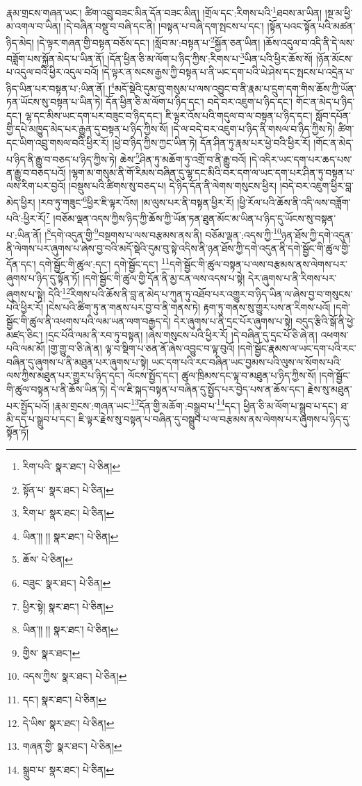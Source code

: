 རྣམ་གྲངས་གཞན་ཡང་། ཚིག་འབྲུ་བཟང་མིན་དོན་བཟང་མིན། །གྲོལ་དང་:རིགས་པའི་\footnote{རིག་པའི་  སྣར་ཐང་།  པེ་ཅིན། }ཐབས་མ་ཡིན། །སྔ་མ་ཕྱི་མ་འགལ་བ་ཡིན། །དེ་བཞིན་བསྡུ་བ་བཞི་དང་ནི། །བསྟན་པ་བཞི་དག་སྤངས་པ་དང་། །སྟོན་པའང་སྟོན་པའི་མཚན་ཉིད་མེད། །དེ་ལྟར་གཞན་གྱི་བསྟན་བཅོས་དང་། །སློབ་མ་:བསྟན་པ་\footnote{སྟོན་པ་  སྣར་ཐང་།  པེ་ཅིན། }སྐྱོན་ཅན་ཡིན། །ཆོས་འདུལ་བ་འདི་ནི་དེ་ལས་བཟློག་པས་སྐྱོན་མེད་པ་ཡིན་ནོ། །དོན་ཕྱིན་ཅི་མ་ལོག་པ་ཉིད་ཀྱིས་:རིགས་པ་\footnote{རིག་པ་  སྣར་ཐང་།  པེ་ཅིན། }ཡིན་པའི་ཕྱིར་ཆོས་སོ། །ཉོན་མོངས་པ་འདུལ་བའི་ཕྱིར་འདུལ་བའོ། །དེ་ལྟར་ན་སངས་རྒྱས་ཀྱི་བསྟན་པ་ནི་ཡང་དག་པའི་ཡེ་ཤེས་དང་སྤངས་པ་འདྲེན་པ་ཉིད་ཡིན་པར་བསྟན་པ་:ཡིན་ནོ། །\footnote{ཡིན་།། །།  སྣར་ཐང་།  པེ་ཅིན། }མདོ་སྡེའི་དུམ་བུ་གསུམ་པ་ལས་འབྱུང་བ་ནི་རྣམ་པ་དྲུག་དག་གིས་ཆོས་ཀྱི་ཡོན་ཏན་ཡོངས་སུ་བསྟན་པ་ཡིན་ཏེ། དོན་ཕྱིན་ཅི་མ་ལོག་པ་ཉིད་དང་། བདེ་བར་འཇུག་པ་ཉིད་དང་། གོང་ན་མེད་པ་ཉིད་དང་། ལྷ་དང་མིས་ཡང་དག་པར་བཟུང་བ་ཉིད་དང་། ཇི་ལྟར་འོས་པའི་གདུལ་བ་ལ་བསྟན་པ་ཉིད་དང་། སློབ་དཔོན་གྱི་དཔེ་མཁྱུད་མེད་པར་རྒྱུན་དུ་བསྟན་པ་ཉིད་ཀྱིས་སོ། །དེ་ལ་བདེ་བར་འཇུག་པ་ཉིད་ནི་གསལ་བ་ཉིད་ཀྱིས་ཏེ། ཚིག་དང་ཡིག་འབྲུ་གསལ་བའི་ཕྱིར་རོ། །ཕྱེ་བ་ཉིད་ཀྱིས་ཀྱང་ཡིན་ཏེ། དོན་ཤིན་ཏུ་རྣམ་པར་ཕྱེ་བའི་ཕྱིར་རོ། །གོང་ན་མེད་པ་ཉིད་ནི་རྒྱུ་བ་བཅད་པ་ཉིད་ཀྱིས་ཏེ། ཆེས་\footnote{ཆོས་  པེ་ཅིན། }ཤིན་ཏུ་མཆོག་ཏུ་འགྲོ་བ་ནི་རྒྱུ་བའོ། །དེ་འདིར་ཡང་དག་པར་ཆད་པས་ན་རྒྱུ་བ་བཅད་པའོ། །ལྷག་མ་གསུམ་ནི་གོ་རིམས་བཞིན་དུ་ལྷ་དང་མིའི་བར་དག་ལ་ཡང་དག་པར་ཤིན་ཏུ་བསྟན་པ་ལས་རིག་པར་བྱའོ། །བསྡུས་པའི་ཚིགས་སུ་བཅད་པ། དེ་ཉིད་དོན་ནི་ལེགས་གསུངས་ཕྱིར། །བདེ་བར་འཇུག་ཕྱིར་བླ་མེད་ཕྱིར། །རབ་ཏུ་གཟུང་\footnote{བཟུང་  སྣར་ཐང་།  པེ་ཅིན། }ཕྱིར་ཇི་ལྟར་འོས། །མ་ལུས་པར་ནི་བསྟན་ཕྱིར་རོ། །ཕྱི་རོལ་པའི་ཆོས་ནི་འདི་ལས་བཟློག་པའི་:ཕྱིར་རོ།\footnote{ཕྱིར་སྟེ།  སྣར་ཐང་།  པེ་ཅིན། } །བཅོམ་ལྡན་འདས་ཀྱིས་ཉིད་ཀྱི་ཆོས་ཀྱི་ཡོན་ཏན་ཐུན་མོང་མ་ཡིན་པ་ཉིད་དུ་ཡོངས་སུ་བསྟན་པ་:ཡིན་ནོ། །\footnote{ཡིན་།། །།  སྣར་ཐང་།  པེ་ཅིན། }དགེ་འདུན་གྱི་\footnote{གྱིས་  སྣར་ཐང་། }བསྔགས་པ་ལས་བརྩམས་ནས་ནི། བཅོམ་ལྡན་:འདས་ཀྱི་\footnote{འདས་ཀྱིས་  སྣར་ཐང་།  པེ་ཅིན། }ཉན་ཐོས་ཀྱི་དགེ་འདུན་ནི་ལེགས་པར་ཞུགས་པ་ཞེས་བྱ་བའི་མདོ་སྡེའི་དུམ་བུ་སྟེ་འདིས་ནི་ཉན་ཐོས་ཀྱི་དགེ་འདུན་ནི་དགེ་སྦྱོང་གི་ཚུལ་གྱི་དོན་དང་། དགེ་སྦྱོང་གི་ཚུལ་:དང་། དགེ་སྦྱོང་དང་། \footnote{དང་།    སྣར་ཐང་།  པེ་ཅིན། }དགེ་སྦྱོང་གི་ཚུལ་བསྟན་པ་ལས་བརྩམས་ནས་ལེགས་པར་ཞུགས་པ་ཉིད་དུ་སྟོན་ཏོ། །དགེ་སྦྱོང་གི་ཚུལ་གྱི་དོན་ནི་མྱ་ངན་ལས་འདས་པ་སྟེ། དེར་ཞུགས་པ་ནི་རིགས་པར་ཞུགས་པ་སྟེ། དེའི་\footnote{དེ་ཡིས་  སྣར་ཐང་།  པེ་ཅིན། }རིགས་པའི་ཆོས་ནི་བླ་ན་མེད་པ་ཀུན་ཏུ་འཐོབ་པར་འགྱུར་བ་ཉིད་ཡིན་ལ་ཞེས་བྱ་བ་གསུངས་པའི་ཕྱིར་རོ། །ངེས་པའི་ཚིག་ཏུ་ན་གནས་པར་བྱ་བ་ནི་གནས་ཏེ། རྟག་ཏུ་གནས་སུ་གྱུར་པས་ན་རིགས་པའོ། །དགེ་སྦྱོང་གི་ཚུལ་ནི་འཕགས་པའི་ལམ་ཡན་ལག་བརྒྱད་དེ། དེར་ཞུགས་པ་ནི་དྲང་པོར་ཞུགས་པ་སྟེ། བདུད་རྩིའི་སྒོ་ནི་ཕྱེ་མཛད་ཅིང་། །དྲང་པོའི་ལམ་ནི་རབ་ཏུ་བསྟན། །ཞེས་གསུངས་པའི་ཕྱིར་རོ། །དེ་བཞིན་དུ་དྲང་པོ་ཅི་ཞེ་ན། འཕགས་པའི་ལམ་མོ། །གྱ་གྱུ་བ་ཅི་ཞེ་ན། ལྟ་བ་སྡིག་པ་ཅན་ནོ་ཞེས་འབྱུང་བ་ལྟ་བུའོ། །དགེ་སྦྱོང་རྣམས་ལ་ཡང་དག་པའི་རང་བཞིན་དུ་ཞུགས་པ་ནི་མཐུན་པར་ཞུགས་པ་སྟེ། ཡང་དག་པའི་རང་བཞིན་ཡང་བྱམས་པའི་ལུས་ལ་སོགས་པའི་ལས་ཀྱིས་མཐུན་པར་གྱུར་པ་ཉིད་དང་། ལོངས་སྤྱོད་དང་། ཚུལ་ཁྲིམས་དང་ལྟ་བ་མཐུན་པ་ཉིད་ཀྱིས་སོ། །དགེ་སྦྱོང་གི་ཚུལ་བསྟན་པ་ནི་ཆོས་ཡིན་ཏེ། དེ་ལ་ཇི་སྐད་བསྟན་པ་བཞིན་དུ་སྤྱོད་པར་བྱེད་པས་ན་ཆོས་དང་། རྗེས་སུ་མཐུན་པར་སྤྱོད་པའོ། །རྣམ་གྲངས་:གཞན་ཡང་\footnote{གཞན་གྱི་  སྣར་ཐང་།  པེ་ཅིན། }དོན་གྱི་མཆོག་:བསྒྲུབ་པ་\footnote{སྒྲུབ་པ་  སྣར་ཐང་།  པེ་ཅིན། }དང་། ཕྱིན་ཅི་མ་ལོག་པ་སྒྲུབ་པ་དང་། ཐ་མི་དད་པ་སྒྲུབ་པ་དང་། ཇི་ལྟར་རྗེས་སུ་བསྟན་པ་བཞིན་དུ་བསྒྲུབ་པ་ལ་བརྩམས་ནས་ལེགས་པར་ཞུགས་པ་ཉིད་དུ་སྟོན་ཏོ། 